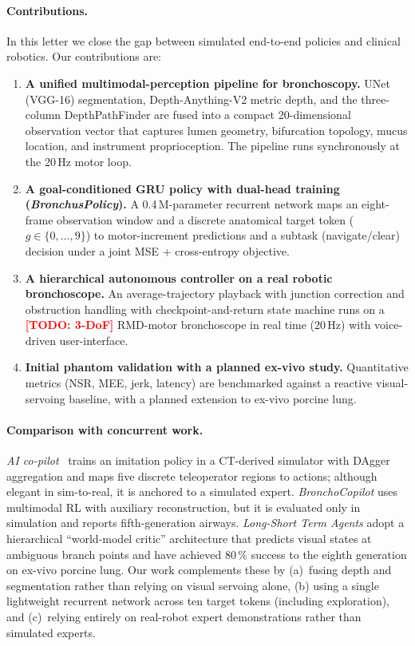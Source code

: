 \documentclass[journal,comsoc]{IEEEtran}
\newcommand{\TODO}[1]{\textcolor{red}{\textbf{[TODO: #1]}}}
\newcommand{\goal}{g}
\begin{document}
\paragraph{Contributions.}
In this letter we close the gap between simulated end-to-end policies
and clinical robotics. Our contributions are:

\begin{enumerate}[leftmargin=*,topsep=2pt,itemsep=0pt]
  \item \textbf{A unified multimodal-perception pipeline for
        bronchoscopy.} UNet (VGG-16) segmentation,
        Depth-Anything-V2 metric depth, and the three-column
        DepthPathFinder are fused into a compact 20-dimensional
        observation vector that captures lumen geometry, bifurcation
        topology, mucus location, and instrument proprioception.
        The pipeline runs synchronously at the 20\,Hz motor loop.
  \item \textbf{A goal-conditioned GRU policy with dual-head training
        (\textit{BronchusPolicy}).} A 0.4\,M-parameter recurrent
        network maps an eight-frame observation window and a
        discrete anatomical target token
        ($\goal\!\in\!\{0,\dots,9\}$) to motor-increment
        predictions and a subtask (navigate/clear) decision under a
        joint MSE + cross-entropy objective.
  \item \textbf{A hierarchical autonomous controller on a real robotic
        bronchoscope.} An average-trajectory playback with junction
        correction and obstruction handling with checkpoint-and-return
        state machine runs on a \TODO{3-DoF} RMD-motor bronchoscope
        in real time (20\,Hz) with voice-driven user-interface.
  \item \textbf{Initial phantom validation with a planned ex-vivo
        study.} Quantitative metrics (NSR, MEE, jerk, latency) are
        benchmarked against a reactive visual-servoing baseline,
        with a planned extension to ex-vivo porcine lung.
\end{enumerate}

\paragraph{Comparison with concurrent work.}
\emph{AI co-pilot}~\cite{zhang2024aicopilot} trains an imitation
policy in a CT-derived simulator with DAgger aggregation and maps five
discrete teleoperator regions to actions; although elegant in
sim-to-real, it is anchored to a simulated expert. \emph{BronchoCopilot}
\cite{pore2024bronchocopilot} uses multimodal RL with auxiliary
reconstruction, but it is evaluated only in simulation and reports
fifth-generation airways. \emph{Long-Short Term Agents}
\cite{longshort2026} adopt a hierarchical ``world-model critic''
architecture that predicts visual states at ambiguous branch points and
have achieved 80\,\% success to the eighth generation on ex-vivo
porcine lung. Our work complements these by (a)~fusing depth and
segmentation rather than relying on visual servoing alone, (b) using
a single lightweight recurrent network across ten target tokens
(including exploration), and (c)~relying entirely on
real-robot expert demonstrations rather than simulated experts.
\end{document}
